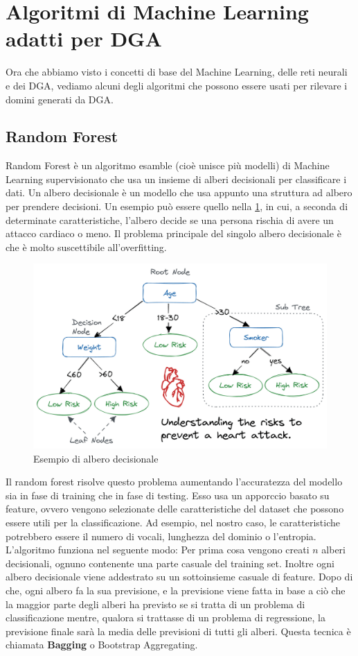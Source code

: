 \documentclass[12pt,a4paper,openright,twoside]{book}
\begin{document}
\section{Algoritmi di Machine Learning adatti per DGA}

Ora che abbiamo visto i concetti di base del Machine Learning, delle reti neurali
e dei DGA, vediamo alcuni degli algoritmi che possono essere usati
per rilevare i domini generati da DGA.

\subsection{Random Forest}

Random Forest è un algoritmo esamble (cioè unisce più modelli) di Machine Learning supervisionato
che usa un insieme di alberi decisionali
per classificare i dati. Un albero decisionale è un modello che usa appunto una struttura ad albero
per prendere decisioni. Un esempio può essere quello nella \cref{fig:decision tree}, in cui, a seconda di determinate
caratteristiche, l'albero decide se una persona rischia di avere un attacco cardiaco o meno.
Il problema principale del singolo albero decisionale è che è molto suscettibile
all'overfitting.
\begin{figure}[H]
    \centering
    \includegraphics[width=.8\linewidth]{figures/Decision_tree_for_heart_attack.png}
    \caption{Esempio di albero decisionale \cite{decision_tree_image}}
    \label{fig:decision tree}
\end{figure}

\noindent Il random forest risolve questo problema aumentando 
l'accuratezza del modello sia in fase di training che in fase di testing. \cite{598994}
Esso usa un apporccio basato su feature, ovvero vengono selezionate
delle caratteristiche del dataset che possono essere utili per la classificazione.
Ad esempio, nel nostro caso, le caratteristiche potrebbero essere
il numero di vocali, lunghezza del dominio o l'entropia.
L'algoritmo funziona nel seguente modo:
Per prima cosa vengono creati $n$ alberi decisionali, ognuno
contenente una parte casuale del training set. Inoltre
ogni albero decisionale viene addestrato su un sottoinsieme casuale
di feature. Dopo di che, ogni albero fa la sua previsione,
e la previsione viene fatta in base a ciò che la maggior parte
degli alberi ha previsto se si tratta di un problema di classificazione mentre, qualora si trattasse di un problema di regressione,
la previsione finale sarà la media delle previsioni di tutti gli alberi.
Questa tecnica è chiamata \textbf{Bagging} o Bootstrap Aggregating.
\end{document}
